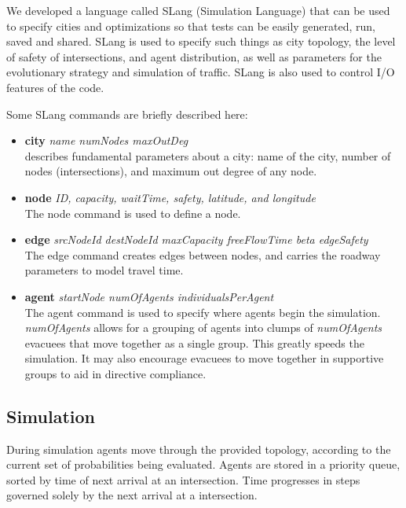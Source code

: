 \documentclass{sig-alternate-05-2015}
\begin{document}
We developed a language called SLang (Simulation Language) that can be
used to specify cities and optimizations so that tests can be easily
generated, run, saved and shared.  SLang is used to specify such
things as city topology, the level of safety of intersections, and
agent distribution, as well as parameters for the evolutionary
strategy and simulation of traffic.  SLang is also used to control I/O
features of the code.

Some SLang commands are briefly described here:

\begin{itemize}
\item \textbf{city} \textit{name numNodes maxOutDeg}\\ describes
  fundamental parameters about a city: name of the city, number of
  nodes (intersections), and maximum out degree of any node.
\item \textbf{node} \textit{ID, capacity, waitTime, safety, latitude,
  and longitude}\\ The node command is used to define a node.
\item \textbf{edge} \textit{srcNodeId destNodeId maxCapacity
  freeFlowTime beta edgeSafety}\\ The edge command creates edges
  between nodes, and carries the roadway parameters to model travel
  time.
\item \textbf{agent} \textit{startNode numOfAgents
  individualsPerAgent}\\ The agent command is used to specify where
  agents begin the simulation.  \textit{numOfAgents} allows for a
  grouping of agents into clumps of \textit{numOfAgents}
  evacuees that move together as a single group.  This greatly speeds
  the simulation.  It may also encourage evacuees to move together in
  supportive groups to aid in directive compliance.
\end{itemize}

\subsection{Simulation}

During simulation agents move through the provided topology, according
to the current set of probabilities being evaluated.  Agents are
stored in a priority queue, sorted by time of next arrival at an
intersection.  Time progresses in steps governed solely by the next
arrival at a intersection.
\end{document}
